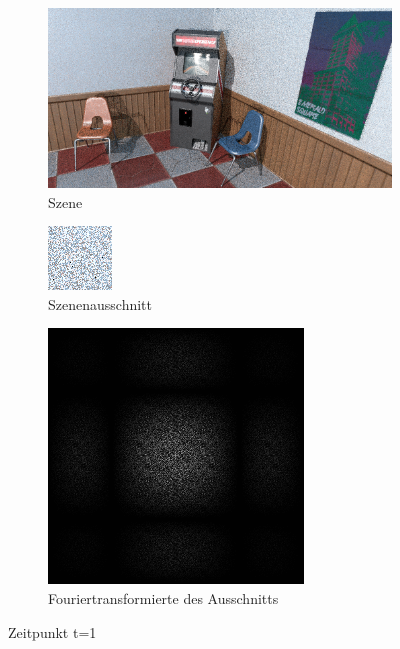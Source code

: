 \label{fig:Retargetbilderstrecke}
\begin{figure}[H]

    \begin{subfigure}{\textwidth}
        \centering \includegraphics[scale=.25]{content/TemporalerAlg/Bilder/Retargeting/Screenshots/seed_debug_3.0_selection.png}
        \caption{Szene}
        \label{fig:Retargeting_And_Sorting_Szene_t1}
    \end{subfigure}
    \begin{subfigure}{0.5\textwidth}
        \centering \includegraphics[width=0.4\linewidth]{content/TemporalerAlg/Bilder/Retargeting/Screenshots/seed_debug_3.0_ausschnitt.png} 
        \caption{Szenenausschnitt}
        \label{fig:Retargeting_And_Sorting_ausschnitt_t1}
    \end{subfigure}
    \begin{subfigure}{0.5\textwidth}
        \centering \includegraphics[width=0.4\linewidth]{content/TemporalerAlg/Bilder/Retargeting/Screenshots/Spektren/seed_debug_3.0_ausschnitt.png}
        \caption{Fouriertransformierte des Ausschnitts}
        \label{fig:Retargeting_And_Sorting_Fouriertransformierte_t1}
    \end{subfigure}
        \caption{Zeitpunkt t=1}
        \label{fig:Retargeting_And_Sorting_Verlauf_t1}
\end{figure}

